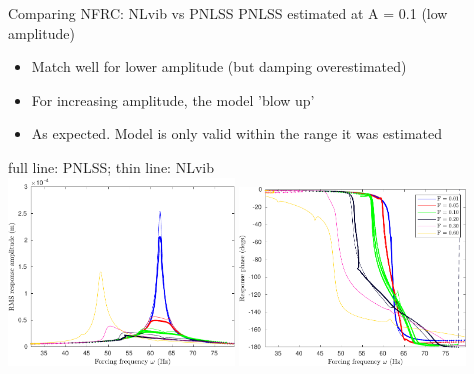 \documentclass[9pt]{beamer}
\begin{document}
\begin{frame}{Comparing NFRC: NLvib vs PNLSS}
  PNLSS estimated at A = 0.1 (low amplitude)
  \begin{itemize}
  \item Match well for lower amplitude (but damping overestimated)
  \item For increasing amplitude, the model 'blow up'
  \item As expected. Model is only valid within the range it was estimated
  \end{itemize}
  \begin{center}
    full line: PNLSS; thin line: NLvib\\
    \includegraphics[width=0.45\textwidth]{fig/b4_pnlssfrf_A01_Amp}
    \includegraphics[width=0.45\textwidth]{fig/b4_pnlssfrf_A01_Phase}
  \end{center}
\end{frame}
\end{document}
